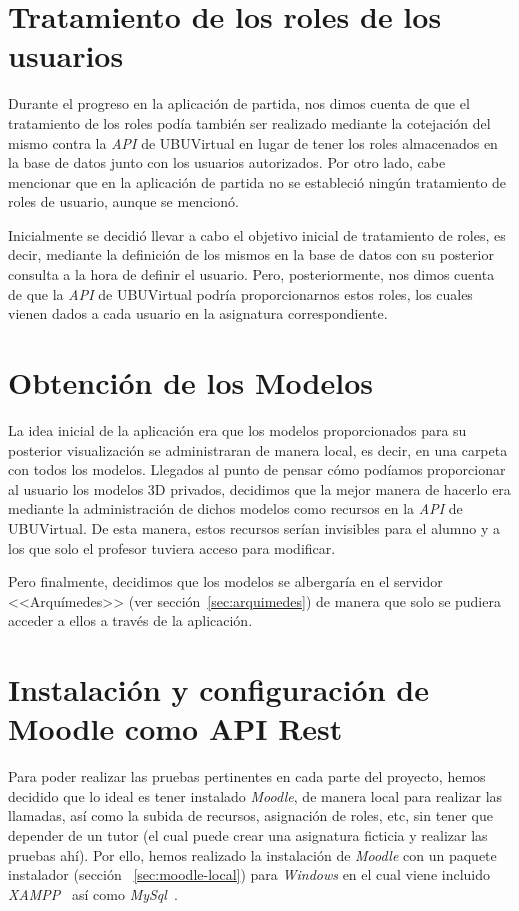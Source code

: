 
\section{Tratamiento de los roles de los usuarios}\label{sec:roles}
Durante el progreso en la aplicación de partida, nos dimos cuenta de que el tratamiento de los roles podía también ser realizado mediante la cotejación del mismo contra la \textit{API} de UBUVirtual en lugar de tener los roles almacenados en la base de datos junto con los usuarios autorizados. Por otro lado, cabe mencionar que en la aplicación de partida no se estableció ningún tratamiento de roles de usuario, aunque se mencionó.

Inicialmente se decidió llevar a cabo el objetivo inicial de tratamiento de roles, es decir, mediante la definición de los mismos en la base de datos con su posterior consulta a la hora de definir el usuario. Pero, posteriormente, nos dimos cuenta de que la \textit{API} de UBUVirtual podría proporcionarnos estos roles, los cuales vienen dados a cada usuario en la asignatura correspondiente.

\section{Obtención de los Modelos}
La idea inicial de la aplicación era que los modelos proporcionados para su posterior visualización se administraran de manera local, es decir, en una carpeta con todos los modelos. Llegados al punto de pensar cómo podíamos proporcionar al usuario los modelos 3D privados, decidimos que la mejor manera de hacerlo era mediante la administración de dichos modelos como recursos en la \textit{API} de UBUVirtual. De esta manera, estos recursos  serían invisibles para el alumno y a los que solo el profesor tuviera acceso para modificar.

Pero finalmente, decidimos que los modelos se albergaría en el servidor <<Arquímedes>> (ver sección~\ref{sec:arquimedes}) de manera que solo se pudiera acceder a ellos a través de la aplicación.

\section{Instalación y configuración de Moodle como API Rest}
Para poder realizar las pruebas pertinentes en cada parte del proyecto, hemos decidido que lo ideal es tener instalado \textit{Moodle}, de manera local para realizar las llamadas, así como la subida de recursos, asignación de roles, etc, sin tener que depender de un tutor (el cual puede crear una asignatura ficticia y realizar las pruebas ahí). Por ello, hemos realizado la instalación de \textit{Moodle} con un paquete instalador (sección ~\ref{sec:moodle-local}) para \textit{Windows} en el cual viene incluido \textit{XAMPP}~\cite{wiki:xampp} así como \textit{MySql}~\cite{wiki:mysql}.

